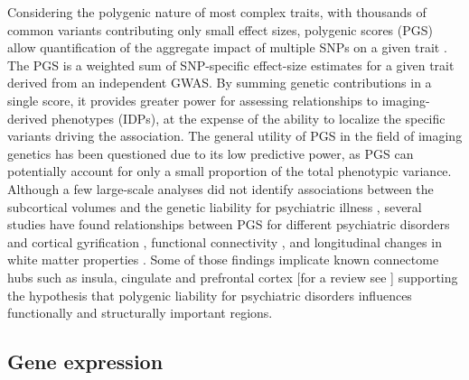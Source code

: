Considering the polygenic nature of most complex traits, with thousands of common variants contributing only small effect sizes, polygenic scores (PGS) allow quantification of the aggregate impact of multiple SNPs on a given trait \citep{Dudbridge2013}. The PGS is a weighted sum of SNP-specific effect-size estimates for a given trait derived from an independent GWAS. By summing genetic contributions in a single score, it provides greater power for assessing relationships to imaging-derived phenotypes (IDPs), at the expense of the ability to localize the specific variants driving the association. The general utility of PGS in the field of imaging genetics has been questioned due to its low predictive power, as PGS can potentially account for only a small proportion of the total phenotypic variance. Although a few large-scale analyses did not identify associations between the subcortical volumes and the genetic liability for psychiatric illness \citep{Franke2016,Reus2017}, several studies have found relationships between PGS for different psychiatric disorders and cortical gyrification \citep{Liu2016a}, functional connectivity \citep{Dezhina2018,Wang2017}, and longitudinal changes in white matter properties \citep{Alloza2018}. Some of those findings implicate known connectome hubs such as insula, cingulate and prefrontal cortex [for a review see \citet{Dezhina2018}] supporting the hypothesis that polygenic liability for psychiatric disorders influences functionally and structurally important regions.

\subsection{Gene expression}

